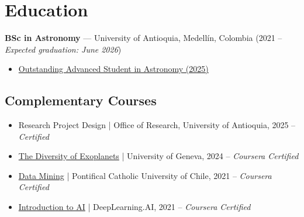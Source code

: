 \section*{Education}
\textbf{BSc in Astronomy} — University of Antioquia, Medellín, Colombia (2021 -- \textit{Expected graduation: June 2026})
\begin{itemize}
    \item \href{https://drive.google.com/file/d/1U0p9EjMKj7JTylV96l90XCa1OudIKOIy/view?usp=sharing}{Outstanding Advanced Student in Astronomy (2025)}
\end{itemize}

\subsection*{Complementary Courses}
\begin{itemize}
    \item Research Project Design | Office of Research, University of Antioquia, 2025 -- \textit{Certified}
    \item \href{https://www.coursera.org/learn/exoplanets}{The Diversity of Exoplanets} | University of Geneva, 2024 -- \textit{Coursera Certified}
    \item \href{https://www.coursera.org/learn/mineria-de-datos-introduccion}{Data Mining} | Pontifical Catholic University of Chile, 2021 -- \textit{Coursera Certified}
    \item \href{https://www.coursera.org/learn/ai-for-everyone}{Introduction to AI} | DeepLearning.AI, 2021 -- \textit{Coursera Certified}
\end{itemize}
